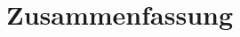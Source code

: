 
\section{Zusammenfassung}
\begin{quote}

\end{quote}



\begin{thebibliography}{999}




\end{thebibliography}


